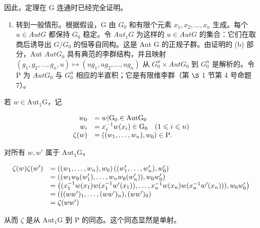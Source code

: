 因此，定理在 G 连通时已经完全证明。

\begin{enumerate}
\def\labelenumi{(\alph{enumi})}
\setcounter{enumi}{2}
\tightlist
\item
  转到一般情形。根据假设，G 由 \(G_{0}\) 和有限个元素 \(x_{1}, x_{2}, \ldots, x_{n}\) 生成。每个 \(u \in AutG\) 都保持 \(G_{0}\) 稳定。令 \(Aut_{1}G\) 为这样的 \(u \in AutG\) 的集合：它们在取商后诱导出 \(G/G_{0}\) 的恒等自同构。这是 Aut G 的正规子群。由证明的 (b) 部分，Aut \(AutG_{0}\) 具有典范的李群结构，并且映射 \((g_{1}, g_{2}, \ldots, g_{n}, u) \mapsto (ug_{1}, ug_{2}, \ldots, ug_{n})\) 从 \(G_{0}^{n} \times AutG_{0}\) 到 \(G_{0}^{n}\) 是解析的。令 P 为 \(AutG_{0}\) 与 \(G_{0}^{n}\) 相应的半直积；它是有限维李群（第 \(\S\) 1 节第 4 号命题 7）。
\end{enumerate}

若 \(w\in \mathrm{Aut}_1\mathrm{G}\)，记

\[
\begin{array}{r l} w _ {0} & = w | \mathrm{G} _ {0} \in \mathrm{Aut}   \mathrm{G} _ {0} \\ w _ {i} & = x _ {i} ^ {- 1} w (x _ {i}) \in \mathrm{G} _ {0} \quad (1 \leqslant i \leqslant n) \\ \zeta (w) & = ((w _ {1}, \ldots , w _ {n}), w _ {0}) \in \mathrm{P}. \end{array}
\]

对所有 \(w, w'\) 属于 \(\mathrm{Aut}_1\mathrm{G}\)，

\[
\begin{array}{r l} \zeta (w) \zeta (w ^ {\prime}) & = \left((w _ {1}, \ldots , w _ {n}), w _ {0}\right) \left((w _ {1} ^ {\prime}, \ldots , w _ {n} ^ {\prime}), w _ {0} ^ {\prime}\right) \\ & = \left((w _ {1} w _ {0} (w _ {1} ^ {\prime}), \ldots , w _ {n} w _ {0} (w _ {n} ^ {\prime})), w _ {0} w _ {0} ^ {\prime}\right) \\ & = \left((x _ {1} ^ {- 1} w (x _ {1}) w (x _ {1} ^ {- 1} w ^ {\prime} (x _ {1})), \ldots , x _ {n} ^ {- 1} w (x _ {n}) w (x _ {n} ^ {- 1} w ^ {\prime} (x _ {n}))), w _ {0} w _ {0} ^ {\prime}\right) \\ & = \left(((w w ^ {\prime}) _ {1}, \ldots , (w w ^ {\prime}) _ {n}), (w w ^ {\prime}) _ {0}\right) \\ & = \zeta (w w ^ {\prime}) \end{array}
\]

从而 \(\zeta\) 是从 \(\mathrm{Aut}_1\mathrm{G}\) 到 P 的同态。这个同态显然是单射。

